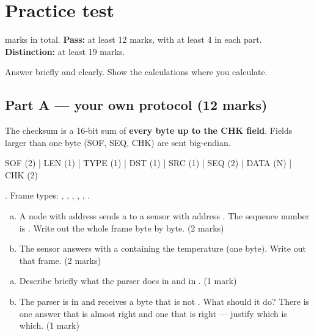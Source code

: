 \chapter{Practice test}
\label{ch:ovningsdugga}

 marks in total. \textbf{Pass:} at least 12 marks, with at least 4 in each part.
\textbf{Distinction:} at least 19 marks.

\bigskip
\noindent Answer briefly and clearly. Show the calculations where you calculate.

\section*{Part A --- your own protocol (12 marks)}

The checksum is a 16-bit sum of \textbf{every byte up to the CHK field}. Fields larger than one
byte (SOF, SEQ, CHK) are sent big-endian.

\begin{console}
SOF (2) | LEN (1) | TYPE (1) | DST (1) | SRC (1) | SEQ (2) | DATA (N) | CHK (2)
\end{console}

\noindent {}. Frame types: , ,
, , , .

\label{ex:d:1}
\begin{enumerate}[a)]
  \item A node with address  sends a  to a sensor with address
    . The sequence number is . Write out the whole frame byte by byte.
    (2 marks)
  \item The sensor answers with a  containing the temperature 
    (one byte). Write out that frame. (2 marks)
\end{enumerate}

\label{ex:d:2}
\begin{enumerate}[a)]
  \item Describe briefly what the parser does in  and in .
    (1 mark)
  \item The parser is in  and receives a byte that is not . What
    should it do? There is one answer that is almost right and one that is right --- justify which
    is which. (1 mark)
\end{enumerate}

